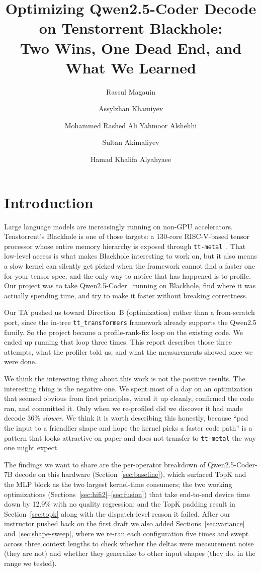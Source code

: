 \documentclass[sigplan,nonacm]{acmart}
\title{Optimizing Qwen2.5-Coder Decode on Tenstorrent Blackhole:\\
       Two Wins, One Dead End, and What We Learned}
\author{Rassul Magauin}
\author{Assylzhan Khamiyev}
\author{Mohammed Rashed Ali Yahmoor Alshehhi}
\author{Sultan Akimaliyev}
\author{Hamad Khalifa Alyahyaee}
\affiliation{%
  \institution{Mohamed bin Zayed University of Artificial Intelligence}
  \city{Abu Dhabi}\country{UAE}}
\begin{document}
\maketitle

\section{Introduction}

Large language models are increasingly running on non-GPU
accelerators. Tenstorrent's Blackhole is one of those targets: a
130-core RISC-V-based tensor processor whose entire memory hierarchy
is exposed through \texttt{tt-metal}~\cite{ttmetal}. That low-level
access is what makes Blackhole interesting to work on, but it also
means a slow kernel can silently get picked when the framework cannot
find a faster one for your tensor spec, and the only way to notice
that has happened is to profile. Our project was to take
Qwen2.5-Coder~\cite{qwen25coder} running on Blackhole, find where it
was actually spending time, and try to make it faster without
breaking correctness.

Our TA pushed us toward Direction~B (optimization) rather than a
from-scratch port, since the in-tree \texttt{tt\_transformers}
framework already supports the Qwen2.5 family. So the project became
a profile-rank-fix loop on the existing code. We ended up running
that loop three times. This report describes those three attempts,
what the profiler told us, and what the measurements showed once we
were done.

We think the interesting thing about this work is not the positive
results. The interesting thing is the negative one. We spent most of
a day on an optimization that seemed obvious from first principles,
wired it up cleanly, confirmed the code ran, and committed it. Only
when we re-profiled did we discover it had made decode 36\%
\emph{slower}. We think it is worth describing this honestly, because
``pad the input to a friendlier shape and hope the kernel picks a
faster code path'' is a pattern that looks attractive on paper and
does not transfer to \texttt{tt-metal} the way one might expect.

The findings we want to share are the per-operator breakdown of
Qwen2.5-Coder-7B decode on this hardware (Section~\ref{sec:baseline}),
which surfaced TopK and the MLP block as the two largest kernel-time
consumers; the two working optimizations
(Sections~\ref{sec:hifi2}--\ref{sec:fusion}) that take end-to-end
device time down by 12.9\% with no quality regression; and the
TopK padding result in Section~\ref{sec:topk} along with the
dispatch-level reason it failed. After our instructor pushed back on
the first draft we also added Sections~\ref{sec:variance}
and~\ref{sec:shape-sweep}, where we re-ran each configuration five
times and swept across three context lengths to check whether the
deltas were measurement noise (they are not) and whether they
generalize to other input shapes (they do, in the range we tested).
\end{document}
